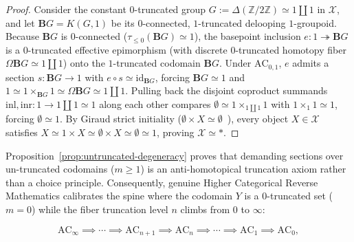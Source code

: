 \documentclass[10pt,twoside,openright]{book}
\theoremstyle{crmplain}
\theoremstyle{crmdef}
\theoremstyle{crmremark}
\begin{document}
\begin{proof}
Consider the constant $0$-truncated group $G := \Delta(\mathbb{Z}/2\mathbb{Z}) \simeq 1 \amalg 1$ in $\mathcal{X}$, and let $\mathbf{B}G = K(G, 1)$ be its $0$-connected, $1$-truncated delooping $1$-groupoid. Because $\mathbf{B}G$ is $0$-connected ($\tau_{\le 0}(\mathbf{B}G) \simeq 1$), the basepoint inclusion $e: 1 \twoheadrightarrow \mathbf{B}G$ is a $0$-truncated effective epimorphism (with discrete $0$-truncated homotopy fiber $\Omega\mathbf{B}G \simeq 1 \amalg 1$) onto the $1$-truncated codomain $\mathbf{B}G$. Under $\mathrm{AC}_{0, 1}$, $e$ admits a section $s: \mathbf{B}G \to 1$ with $e \circ s \simeq \mathrm{id}_{\mathbf{B}G}$, forcing $\mathbf{B}G \simeq 1$ and $1 \simeq 1 \times_{\mathbf{B}G} 1 \simeq \Omega\mathbf{B}G \simeq 1 \amalg 1$. Pulling back the disjoint coproduct summands $\mathrm{inl}, \mathrm{inr} : 1 \to 1 \amalg 1 \simeq 1$ along each other compares $\emptyset \simeq 1 \times_{1 \amalg 1} 1$ with $1 \times_1 1 \simeq 1$, forcing $\emptyset \simeq 1$. By Giraud strict initiality ($\emptyset \times X \simeq \emptyset$~\cite[Thm.~6.1.0.6]{Lurie09}), every object $X \in \mathcal{X}$ satisfies $X \simeq 1 \times X \simeq \emptyset \times X \simeq \emptyset \simeq 1$, proving $\mathcal{X} \simeq *$.
\end{proof}

Proposition~\ref{prop:untruncated-degeneracy} proves that demanding sections over un-truncated codomains ($m \ge 1$) is an anti-homotopical truncation axiom rather than a choice principle. Consequently, genuine Higher Categorical Reverse Mathematics calibrates the spine where the codomain $Y$ is a $0$-truncated set ($m = 0$) while the fiber truncation level $n$ climbs from $0$ to $\infty$:

\[
  \mathrm{AC}_\infty \implies \cdots \implies \mathrm{AC}_{n+1} \implies \mathrm{AC}_n \implies \cdots \implies \mathrm{AC}_1 \implies \mathrm{AC}_0,
\]
\end{document}
